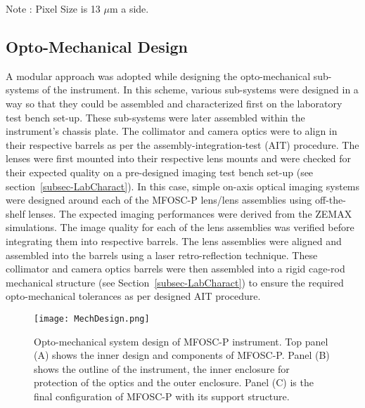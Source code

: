 \begin{table}
	\begin{list}{}{}
		\item Note : Pixel Size is 13 $\mu$m a side.
	\end{list}
\end{table}



\par
\subsection{Opto-Mechanical Design} 
\label{subsec-OptoMechDesign}
\par

A modular approach was adopted while designing the opto-mechanical sub-systems of the instrument. In this scheme, various sub-systems were designed in a way so that they could be assembled and characterized first on the laboratory test bench set-up. These sub-systems were later assembled within the instrument's chassis plate. The collimator and camera optics were to align in their respective barrels as per the assembly-integration-test (AIT) procedure. The lenses were first mounted into their respective lens mounts and were checked for their expected quality on a pre-designed imaging test bench set-up (see section~\ref{subsec-LabCharact}). In this case, simple on-axis optical imaging systems were designed around each of the MFOSC-P lens/lens assemblies using off-the-shelf lenses. The expected imaging performances were derived from the ZEMAX simulations. The image quality for each of the lens assemblies was verified before integrating them into respective barrels. The lens assemblies were aligned and assembled into the barrels using a laser retro-reflection technique. These collimator and camera optics barrels were then assembled into a rigid cage-rod mechanical structure (see Section~\ref{subsec-LabCharact}) to ensure the required opto-mechanical tolerances as per designed AIT procedure.


\begin{figure*}
	\centering
	\texttt{[image: MechDesign.png]}
	\vspace{0.2cm}
	\caption{Opto-mechanical system design of MFOSC-P instrument. Top panel (A) shows the inner design and components of MFOSC-P. Panel (B) shows the outline of the instrument, the inner enclosure for protection of the optics and the outer enclosure. Panel (C) is the final configuration of MFOSC-P with its support structure.}
	\label{fig-MechDesign}
\end{figure*}

